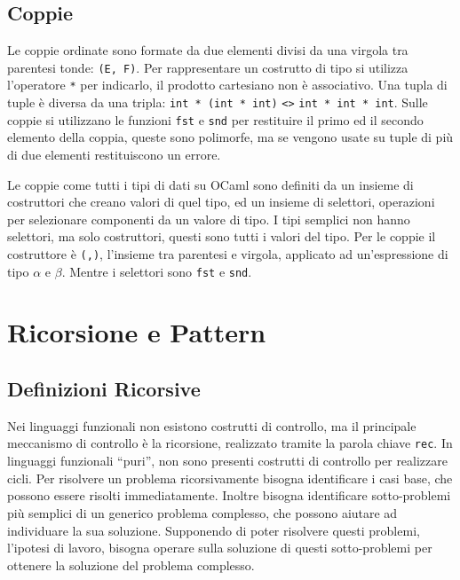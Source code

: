 \documentclass{article}
\numberwithin{equation}{subsection}
\begin{document}
\subsection{Coppie}

Le coppie ordinate sono formate da due elementi divisi da una virgola tra parentesi tonde: \verb|(E, F)|. Per rappresentare un costrutto di tipo si utilizza l'operatore \verb|*| per indicarlo, il prodotto cartesiano non è associativo. Una tupla di tuple è diversa da una tripla: \verb|int * (int * int)| \verb|<>| \verb|int * int * int|. 
Sulle coppie si utilizzano le funzioni \verb|fst| e \verb|snd| per restituire il primo ed il secondo elemento della coppia, queste sono polimorfe, ma se vengono usate su tuple di più di due elementi restituiscono un errore. 

Le coppie come tutti i tipi di dati su OCaml sono definiti da un insieme di costruttori che creano valori di quel tipo, ed un insieme di selettori, operazioni per selezionare componenti da un valore di tipo. 
I tipi semplici non hanno selettori, ma solo costruttori, questi sono tutti i valori del tipo. 
Per le coppie il costruttore è \verb|(,)|, l'insieme tra parentesi e virgola, applicato ad un'espressione di tipo $\alpha$ e $\beta$. Mentre i selettori sono \verb|fst| e \verb|snd|. 



\clearpage

\section{Ricorsione e Pattern}

\subsection{Definizioni Ricorsive}

Nei linguaggi funzionali non esistono costrutti di controllo, ma il principale meccanismo di controllo è la ricorsione, realizzato tramite la parola chiave \verb|rec|. 
In linguaggi funzionali ``puri'', non sono presenti costrutti di controllo per realizzare cicli. Per risolvere un problema ricorsivamente bisogna identificare i casi base, che possono essere risolti immediatamente. Inoltre bisogna identificare sotto-problemi più semplici di un generico problema complesso, che possono aiutare ad individuare la sua soluzione. Supponendo di poter risolvere questi problemi, l'ipotesi di lavoro, bisogna operare sulla soluzione di questi sotto-problemi per ottenere la soluzione del problema complesso. 
\end{document}
